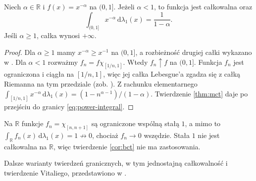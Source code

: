\begin{przyklad}
\label{ex:power-integral}
Niech $\alpha\in\mathbb R$ i
$f(x)=x^{-\alpha}$ na $(0,1]$.
Jeżeli $\alpha<1$, to funkcja jest całkowalna oraz
\begin{equation}\label{eq:power-integral}
\int_{(0,1]}x^{-\alpha}\,\mathrm d\lambda_1(x)
=\frac1{1-\alpha}.
\end{equation}
Jeśli $\alpha\ge1$, całka wynosi $+\infty$.
\end{przyklad}
\begin{proof}
Dla $\alpha\ge1$ mamy $x^{-\alpha}\ge x^{-1}$
na $(0,1]$, a rozbieżność drugiej całki
wykazano w . Dla $\alpha<1$
rozważmy $f_n=f\chi_{[1/n,1]}$.
Wtedy $f_n\uparrow f$ na $(0,1]$.
Funkcja $f_n$ jest ograniczona i ciągła na
$[1/n,1]$, więc jej całka Lebesgue'a zgadza się
z całką Riemanna na tym przedziale (zob.
).
Z rachunku elementarnego
$\int_{[1/n,1]}x^{-\alpha}\,\mathrm d\lambda_1(x)
=(1-n^{\alpha-1})/(1-\alpha)$.
Twierdzenie \ref{thm:mct} daje po przejściu do
granicy \eqref{eq:power-integral}.
\end{proof}

\begin{przyklad}
Na $\mathbb R$ funkcje $f_n=\chi_{[n,n+1]}$
są ograniczone wspólną stałą $1$, a mimo to
$\int_{\mathbb R}f_n(x)\,\mathrm d\lambda_1(x)=1\not\to0$, chociaż $f_n\to0$ wszędzie.
Stała $1$ nie jest całkowalna na $\mathbb R$,
więc twierdzenie \ref{cor:bct} nie ma zastosowania.
\end{przyklad}



Dalsze warianty twierdzeń granicznych, w tym jednostajną
całkowalność i twierdzenie Vitaliego, przedstawiono w
.

